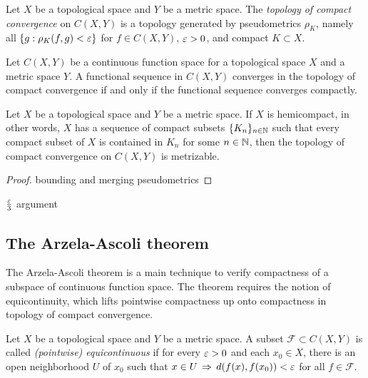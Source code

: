 \documentclass{../crs}
\begin{document}
\begin{defn}
Let $X$ be a topological space and $Y$ be a metric space.
The \emph{topology of compact convergence} on $C(X,Y)$ is a topology generated by pseudometrics $\rho_K$, namely all $\{g:\rho_K(f,g)<\varepsilon\}$ for $f\in C(X,Y)$, $\varepsilon>0$, and compact $K\subset X$.
\end{defn}

\begin{prop}
Let $C(X,Y)$ be a continuous function space for a topological space $X$ and a metric space $Y$.
A functional sequence in $C(X,Y)$ converges in the topology of compact convergence if and only if the functional sequence converges compactly.
\end{prop}

\begin{thm}
Let $X$ be a topological space and $Y$ be a metric space.
If $X$ is hemicompact, in other words, $X$ has a sequence of compact subsets $\{K_n\}_{n\in\mathbb{N}}$ such that every compact subset of $X$ is contained in $K_n$ for some $n\in\mathbb{N}$, then the topology of compact convergence on $C(X,Y)$ is metrizable.
\end{thm}

\begin{proof}
bounding and merging pseudometrics
\end{proof}


$\frac{\varepsilon}3$ argument









\subsection{The Arzela-Ascoli theorem}

The Arzela-Ascoli theorem is a main technique to verify compactness of a subspace of continuous function space.
The theorem requires the notion of equicontinuity, which lifts pointwise compactness up onto compactness in topology of compact convergence.

\begin{defn}
Let $X$ be a topological space and $Y$ be a metric space.
A subset $\mathcal{F}\subset C(X,Y)$ is called \emph{(pointwise) equicontinuous} if for every $\varepsilon>0$ and each $x_0\in X$, there is an open neighborhood $U$ of $x_0$ such that $x\in U\,\Rightarrow\,d(f(x),f(x_0))<\varepsilon$ for all $f\in\mathcal{F}$.
\end{defn}
\end{document}
